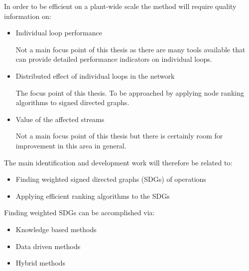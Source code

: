 \documentclass{article}
\begin{document}
In order to be efficient on a plant-wide scale the method will require quality information on:
\begin{itemize}
\item Individual loop performance

Not a main focus point of this thesis as there are many tools available that can provide detailed performance indicators on individual loops.
\item Distributed effect of individual loops in the network

The focus point of this thesis.
To be approached by applying node ranking algorithms to signed directed graphs.
\item Value of the affected streams

Not a main focus point of this thesis but there is certainly room for improvement in this area in general.
\end{itemize}

The main identification and development work will therefore be related to:

\begin{itemize}
\item Finding weighted signed directed graphs (SDGs) of operations
\item Applying efficient ranking algorithms to the SDGs
\end{itemize}

Finding weighted SDGs can be accomplished via:
\begin{itemize}
\item Knowledge based methods

%

\item Data driven methods

%

\item Hybrid methods

\end{itemize}
\end{document}
